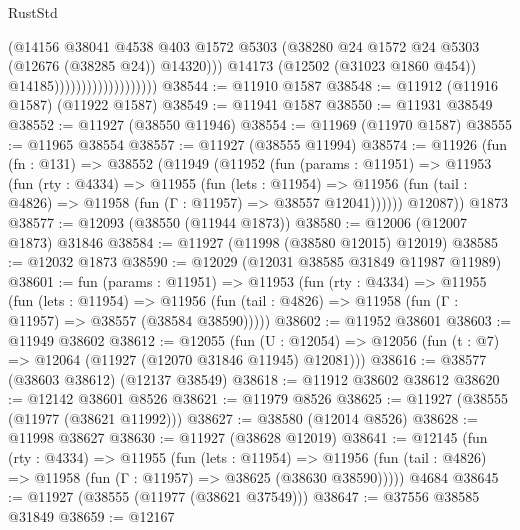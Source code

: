 \begin{lexlean}{RustStd}
\begin{coremodule}
                                            (@14156
                                              @38041
                                              @4538
                                              @403
                                              @1572
                                              @5303
                                              (@38280
                                                @24
                                                @1572
                                                @24
                                                @5303
                                                (@12676 (@38285 @24))
                                                @14320)))
                                          @14173
                                          (@12502 (@31023 @1860 @454))
                                          @14185)))))))))))))))))))
@38544 := @11910 @1587
@38548 := @11912 (@11916 @1587) (@11922 @1587)
@38549 := @11941 @1587
@38550 := @11931 @38549
@38552 := @11927 (@38550 @11946)
@38554 := @11969 (@11970 @1587)
@38555 := @11965 @38554
@38557 := @11927 (@38555 @11994)
@38574 := @11926
    (fun (fn : @131) =>
    @38552
      (@11949
        (@11952
          (fun (params : @11951) =>
          @11953
            (fun (rty : @4334) =>
            @11955
              (fun (lets : @11954) =>
              @11956 (fun (tail : @4826) => @11958 (fun (Γ : @11957) => @38557 @12041))))))
        @12087))
    @1873
@38577 := @12093 (@38550 (@11944 @1873))
@38580 := @12006 (@12007 @1873) @31846
@38584 := @11927 (@11998 (@38580 @12015) @12019)
@38585 := @12032 @1873
@38590 := @12029 (@12031 @38585 @31849 @11987 @11989)
@38601 := fun (params : @11951) =>
  @11953
    (fun (rty : @4334) =>
    @11955
      (fun (lets : @11954) =>
      @11956 (fun (tail : @4826) => @11958 (fun (Γ : @11957) => @38557 (@38584 @38590)))))
@38602 := @11952 @38601
@38603 := @11949 @38602
@38612 := @12055
    (fun (U : @12054) => @12056 (fun (t : @7) => @12064 (@11927 (@12070 @31846 @11945) @12081)))
@38616 := @38577 (@38603 @38612) (@12137 @38549)
@38618 := @11912 @38602 @38612
@38620 := @12142 @38601 @8526
@38621 := @11979 @8526
@38625 := @11927 (@38555 (@11977 (@38621 @11992)))
@38627 := @38580 (@12014 @8526)
@38628 := @11998 @38627
@38630 := @11927 (@38628 @12019)
@38641 := @12145
    (fun (rty : @4334) =>
    @11955
      (fun (lets : @11954) =>
      @11956 (fun (tail : @4826) => @11958 (fun (Γ : @11957) => @38625 (@38630 @38590)))))
    @4684
@38645 := @11927 (@38555 (@11977 (@38621 @37549)))
@38647 := @37556 @38585 @31849
@38659 := @12167

\end{coremodule}
\end{lexlean}
